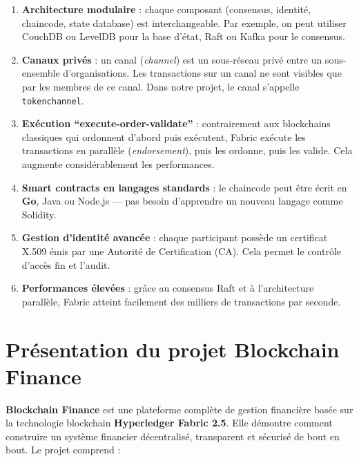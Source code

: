 \documentclass[12pt,a4paper,twoside]{report}
\begin{document}
\begin{enumerate}
    \item \textbf{Architecture modulaire} : chaque composant (consensus, identité, chaincode, state database) est interchangeable. Par exemple, on peut utiliser CouchDB ou LevelDB pour la base d'état, Raft ou Kafka pour le consensus.
    
    \item \textbf{Canaux privés} : un canal (\textit{channel}) est un sous-réseau privé entre un sous-ensemble d'organisations. Les transactions sur un canal ne sont visibles que par les membres de ce canal. Dans notre projet, le canal s'appelle \texttt{tokenchannel}.
    
    \item \textbf{Exécution ``execute-order-validate''} : contrairement aux blockchains classiques qui ordonnent d'abord puis exécutent, Fabric exécute les transactions en parallèle (\textit{endorsement}), puis les ordonne, puis les valide. Cela augmente considérablement les performances.
    
    \item \textbf{Smart contracts en langages standards} : le chaincode peut être écrit en \textbf{Go}, Java ou Node.js --- pas besoin d'apprendre un nouveau langage comme Solidity.
    
    \item \textbf{Gestion d'identité avancée} : chaque participant possède un certificat X.509 émis par une Autorité de Certification (CA). Cela permet le contrôle d'accès fin et l'audit.
    
    \item \textbf{Performances élevées} : grâce au consensus Raft et à l'architecture parallèle, Fabric atteint facilement des milliers de transactions par seconde.
\end{enumerate}

\section{Présentation du projet Blockchain Finance}

\textbf{Blockchain Finance} est une plateforme complète de gestion financière basée sur la technologie blockchain \textbf{Hyperledger Fabric 2.5}. Elle démontre comment construire un système financier décentralisé, transparent et sécurisé de bout en bout. Le projet comprend :
\end{document}
